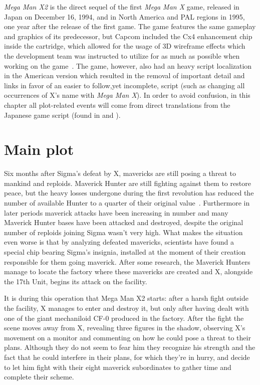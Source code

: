 
\textit{Mega Man X2} is the direct sequel of the first \textit{Mega Man X} game, released in Japan on December 16, 1994, and in North America and PAL regions in 1995, one year after the release of the first game. The game features the same gameplay and graphics of its predecessor, but  Capcom included the Cx4 enhancement chip inside the cartridge, which allowed for the usage of 3D wireframe effects which the development team was instructed to utilize for as much as possible when working on the game~\cite{wiki:MMX2}. The game, however, also had an heavy script localization in the American version which resulted in the removal of important detail and links in favor of an easier to follow,yet incomplete, script (such as changing all occurrences of X's name with \textit{Mega Man X}). In order to avoid confusion, in this chapter all plot-related events will come from direct translations from the Japanese game script (found in \cite{wordpress:X2_japanese_script} and \cite{gamesfaq:X2_japanese_script}).

\section{Main plot}
Six months after Sigma's defeat by X, mavericks are still posing a threat to mankind and reploids. Maverick Hunter are still fighting against them to restore peace, but the heavy losses undergone during the first revolution has reduced the number of available Hunter to a quarter of their original value~\cite{Xcoll1:Manual_X2}. Furthermore in later periods maverick attacks have been increasing in number and many Maverick Hunter bases have been attacked and destroyed, despite the original number of reploids joining Sigma wasn't very high. What makes the situation even worse is that by analyzing defeated mavericks, scientists have found a special chip bearing Sigma's insignia, installed at the moment of their creation responsible for them going maverick. After some research, the  Maverick Hunters manage to locate the factory where these mavericks are created and X, alongside the 17th Unit, begins its attack on the facility.

It is during this operation that Mega Man X2 starts: after a harsh fight outside the facility, X manages to enter and destroy it, but only after having dealt with one of the giant mechaniloid CF-0 produced in the factory. After the fight the scene moves away from X, revealing three figures in the shadow, observing X's movement on a monitor and commenting on how he could pose a threat to their plans. Although they do not seem to fear him they recognize his strength and the fact that he could interfere in their plans, for which they're in hurry, and decide to let him fight with their eight maverick subordinates to gather time and complete their scheme.

